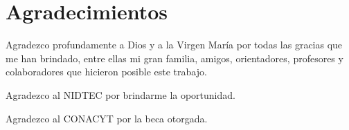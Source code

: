 \chapter*{Agradecimientos}

Agradezco profundamente a Dios y a la Virgen Mar\'ia por todas las gracias que me han brindado, entre ellas mi gran familia, amigos, orientadores, profesores y colaboradores que hicieron posible este trabajo.

Agradezco al NIDTEC por brindarme la oportunidad.

Agradezco al CONACYT por la beca otorgada.


